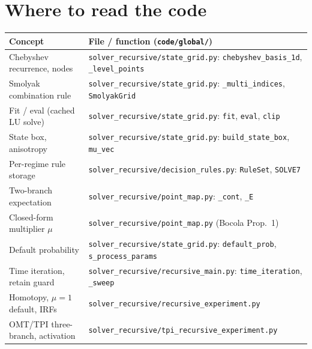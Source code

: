 \documentclass[11pt]{article}
\newcommand{\code}[1]{\texttt{#1}}
\begin{document}
\section*{Where to read the code}
\begin{center}
\small
\begin{tabular}{@{}ll@{}}
\toprule
Concept & File / function (\code{code/global/}) \\
\midrule
Chebyshev recurrence, nodes & \code{solver\_recursive/state\_grid.py}: \code{chebyshev\_basis\_1d}, \code{\_level\_points} \\
Smolyak combination rule & \code{solver\_recursive/state\_grid.py}: \code{\_multi\_indices}, \code{SmolyakGrid} \\
Fit / eval (cached LU solve) & \code{solver\_recursive/state\_grid.py}: \code{fit}, \code{eval}, \code{clip} \\
State box, anisotropy & \code{solver\_recursive/state\_grid.py}: \code{build\_state\_box}, \code{mu\_vec} \\
Per-regime rule storage & \code{solver\_recursive/decision\_rules.py}: \code{RuleSet}, \code{SOLVE7} \\
Two-branch expectation & \code{solver\_recursive/point\_map.py}: \code{\_cont}, \code{\_E} \\
Closed-form multiplier $\mu$ & \code{solver\_recursive/point\_map.py} (Bocola Prop.\ 1) \\
Default probability & \code{solver\_recursive/state\_grid.py}: \code{default\_prob}, \code{s\_process\_params} \\
Time iteration, retain guard & \code{solver\_recursive/recursive\_main.py}: \code{time\_iteration}, \code{\_sweep} \\
Homotopy, $\mu=1$ default, IRFs & \code{solver\_recursive/recursive\_experiment.py} \\
OMT/TPI three-branch, activation & \code{solver\_recursive/tpi\_recursive\_experiment.py} \\
\bottomrule
\end{tabular}
\end{center}
\end{document}
